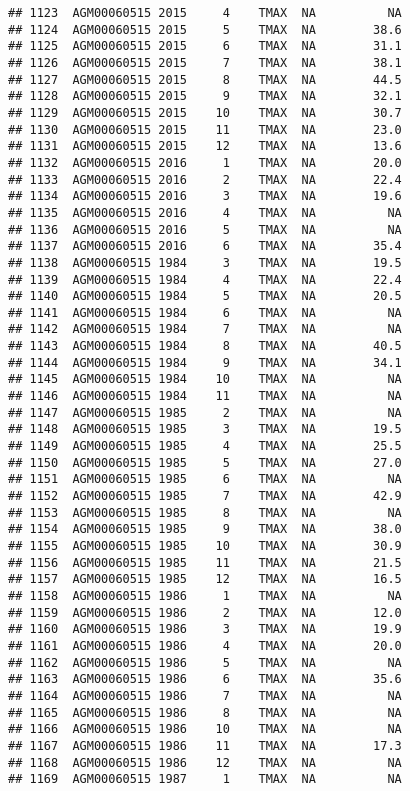 \documentclass{article}\usepackage[]{graphicx}\usepackage[]{color}
\makeatletter
\newenvironment{kframe}{%
 \def\at@end@of@kframe{}%
 \ifinner\ifhmode%
  \def\at@end@of@kframe{\end{minipage}}%
  \begin{minipage}{\columnwidth}%
 \fi\fi%
 \def\FrameCommand##1{\hskip\@totalleftmargin \hskip-\fboxsep
 \colorbox{shadecolor}{##1}\hskip-\fboxsep
     \hskip-\linewidth \hskip-\@totalleftmargin \hskip\columnwidth}%
 \MakeFramed {\advance\hsize-\width
   \@totalleftmargin\z@ \linewidth\hsize
   \@setminipage}}%
 {\par\unskip\endMakeFramed%
 \at@end@of@kframe}
\newenvironment{knitrout}{}{} %
\makeatother
\begin{document}
\begin{knitrout}
\begin{kframe}
\begin{verbatim}
## 1123  AGM00060515 2015     4    TMAX  NA          NA
## 1124  AGM00060515 2015     5    TMAX  NA        38.6
## 1125  AGM00060515 2015     6    TMAX  NA        31.1
## 1126  AGM00060515 2015     7    TMAX  NA        38.1
## 1127  AGM00060515 2015     8    TMAX  NA        44.5
## 1128  AGM00060515 2015     9    TMAX  NA        32.1
## 1129  AGM00060515 2015    10    TMAX  NA        30.7
## 1130  AGM00060515 2015    11    TMAX  NA        23.0
## 1131  AGM00060515 2015    12    TMAX  NA        13.6
## 1132  AGM00060515 2016     1    TMAX  NA        20.0
## 1133  AGM00060515 2016     2    TMAX  NA        22.4
## 1134  AGM00060515 2016     3    TMAX  NA        19.6
## 1135  AGM00060515 2016     4    TMAX  NA          NA
## 1136  AGM00060515 2016     5    TMAX  NA          NA
## 1137  AGM00060515 2016     6    TMAX  NA        35.4
## 1138  AGM00060515 1984     3    TMAX  NA        19.5
## 1139  AGM00060515 1984     4    TMAX  NA        22.4
## 1140  AGM00060515 1984     5    TMAX  NA        20.5
## 1141  AGM00060515 1984     6    TMAX  NA          NA
## 1142  AGM00060515 1984     7    TMAX  NA          NA
## 1143  AGM00060515 1984     8    TMAX  NA        40.5
## 1144  AGM00060515 1984     9    TMAX  NA        34.1
## 1145  AGM00060515 1984    10    TMAX  NA          NA
## 1146  AGM00060515 1984    11    TMAX  NA          NA
## 1147  AGM00060515 1985     2    TMAX  NA          NA
## 1148  AGM00060515 1985     3    TMAX  NA        19.5
## 1149  AGM00060515 1985     4    TMAX  NA        25.5
## 1150  AGM00060515 1985     5    TMAX  NA        27.0
## 1151  AGM00060515 1985     6    TMAX  NA          NA
## 1152  AGM00060515 1985     7    TMAX  NA        42.9
## 1153  AGM00060515 1985     8    TMAX  NA          NA
## 1154  AGM00060515 1985     9    TMAX  NA        38.0
## 1155  AGM00060515 1985    10    TMAX  NA        30.9
## 1156  AGM00060515 1985    11    TMAX  NA        21.5
## 1157  AGM00060515 1985    12    TMAX  NA        16.5
## 1158  AGM00060515 1986     1    TMAX  NA          NA
## 1159  AGM00060515 1986     2    TMAX  NA        12.0
## 1160  AGM00060515 1986     3    TMAX  NA        19.9
## 1161  AGM00060515 1986     4    TMAX  NA        20.0
## 1162  AGM00060515 1986     5    TMAX  NA          NA
## 1163  AGM00060515 1986     6    TMAX  NA        35.6
## 1164  AGM00060515 1986     7    TMAX  NA          NA
## 1165  AGM00060515 1986     8    TMAX  NA          NA
## 1166  AGM00060515 1986    10    TMAX  NA          NA
## 1167  AGM00060515 1986    11    TMAX  NA        17.3
## 1168  AGM00060515 1986    12    TMAX  NA          NA
## 1169  AGM00060515 1987     1    TMAX  NA          NA

\end{verbatim}
\end{kframe}
\end{knitrout}
\end{document}
